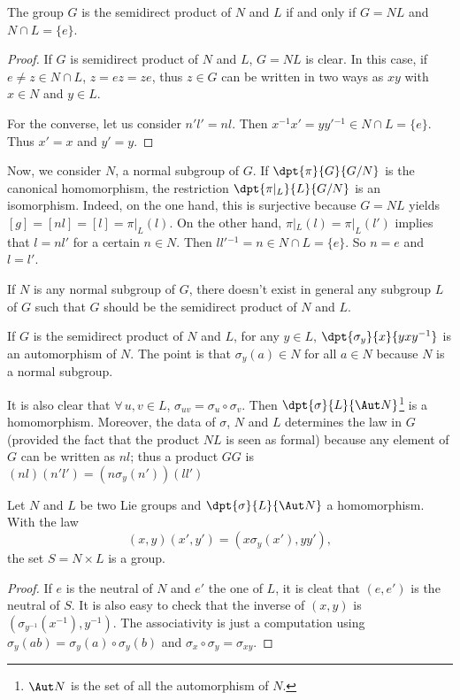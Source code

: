 \begin{proposition}
The group $G$ is the semidirect product of $N$ and $L$ if and only if $G=NL$ and $N\cap L=\{e\}$.
\end{proposition}

\begin{proof}

If $G$ is semidirect product of $N$ and $L$, $G=NL$ is clear. In this case, if $e\neq z\in N\cap L$, $z=ez=ze$, thus $z\in G$ can be written in two ways as $xy$ with $x\in N$ and $y\in L$.

For the converse, let us consider $n'l'=nl$. Then $x^{-1} x'=yy'{}^{-1}\in N\cap L=\{e\}$. Thus $x'=x$ and $y'=y$.
\end{proof}

Now, we consider $N$, a normal subgroup of $G$. If $\dpt{\pi}{G}{G/N}$ is the canonical homomorphism, the restriction $\dpt{\pi|_L}{L}{G/N}$ is an isomorphism. Indeed, on the one hand, this is surjective because $G=NL$ yields 
$[g]=[nl]=[l]=\pi|_L(l)$. On the other hand, $\pi|_L(l)=\pi|_L(l')$ implies that $l=nl'$ for a certain $n\in N$. Then $ll'{}^{-1}=n\in N\cap L=\{e\}$. So $n=e$ and $l=l'$.

\begin{remark}
If $N$ is any normal subgroup of $G$, there doesn't exist in general any subgroup $L$ of $G$ such that $G$ should be the semidirect product of $N$ and $L$.
\end{remark}

If $G$ is the semidirect product of $N$ and $L$, for any $y\in L$, $\dpt{\sigma_y}{x}{yxy^{-1}}$ is an automorphism of $N$. The point is that $\sigma_y(a)\in N$ for all $a\in N$ because $N$ is a normal subgroup.

It is also clear that $\forall\,u,v\in L$, $\sigma_{uv}=\sigma_u\circ\sigma_v$. Then $\dpt{\sigma}{L}{\Aut N}$\footnote{$\Aut N$ is the set of all the automorphism of $N$.} is a homomorphism. Moreover, the data of $\sigma$, $N$ and $L$ determines the law in $G$ (provided the fact that the product $NL$ is seen as formal) because any element of $G$ can be written as $nl$; thus a product $GG$ is $(nl)(n'l')=(n\sigma_y(n'))(ll')$

\begin{proposition}
Let $N$ and $L$ be two Lie groups and $\dpt{\sigma}{L}{\Aut N}$ a homomorphism. With the law 
\[
   (x,y)(x',y')=(x\sigma_y(x'),yy'),
\]
the set $S=N\times L$ is a group.

\end{proposition}
\begin{proof}
    If $e$ is the neutral of $N$ and $e'$ the one of $L$, it is cleat that $(e,e')$ is the neutral of $S$. It is also easy to check that the inverse of $(x,y)$ is $(\sigma_{y^{-1}}(x^{-1}),y^{-1})$. The associativity is just a computation using $\sigma_y(ab)=\sigma_y(a)\circ\sigma_y(b)$ and $\sigma_x\circ\sigma_y=\sigma_{xy}$.
\end{proof}

